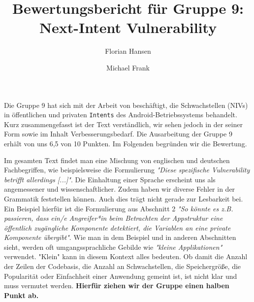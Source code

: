 \documentclass{article}
\author{Florian Hansen \and Michael Frank}
\title{Bewertungsbericht für Gruppe 9: Next-Intent Vulnerability}
\begin{document}
  \maketitle

  Die Gruppe 9 hat sich mit der Arbeit von \cite{niv} beschäftigt, die
  Schwachstellen (NIVs) in öffentlichen und privaten \texttt{Intents} des
  Android-Betriebssystems behandelt. Kurz zusammengefasst ist der Text
  verständlich, wir sehen jedoch in der seiner Form sowie im Inhalt
  Verbesserungsbedarf. Die Ausarbeitung der Gruppe 9 erhält von uns 6,5 von 10
  Punkten. Im Folgenden begründen wir die Bewertung.

  Im gesamten Text findet man eine Mischung von englischen und deutschen
  Fachbegriffen, wie beispielsweise die Formulierung \textit{"Diese spezifische
  Vulnerability betrifft allerdings [...]"}. Die Einhaltung einer Sprache
  erscheint uns als angemessener und wissenschaftlicher. Zudem haben wir
  diverse Fehler in der Grammatik feststellen können. Auch dies trägt nicht
  gerade zur Lesbarkeit bei. Ein Beispiel hierfür ist die Formulierung aus
  Abschnitt 2 \textit{"So könnte es z.B. passieren, dass ein/e Angreifer*in beim
  Betrachten der Appstruktur eine öffentlich zugängliche Komponente
  detektiert, die Variablen an eine private Komponente übergibt"}. Wie man in
  dem Beispiel und in anderen Abschnitten sieht, werden oft umgangssprachliche
  Gebilde wie \textit{"kleine Applikationen"} verwendet. "Klein" kann in
  diesem Kontext alles bedeuten. Ob damit die Anzahl der Zeilen der Codebasis,
  die Anzahl an Schwachstellen, die Speichergröße, die Popularität oder
  Einfachheit einer Anwendung gemeint ist, ist nicht klar und muss vermutet
  werden. \textbf{Hierfür ziehen wir der Gruppe einen halben Punkt ab.}
\end{document}
